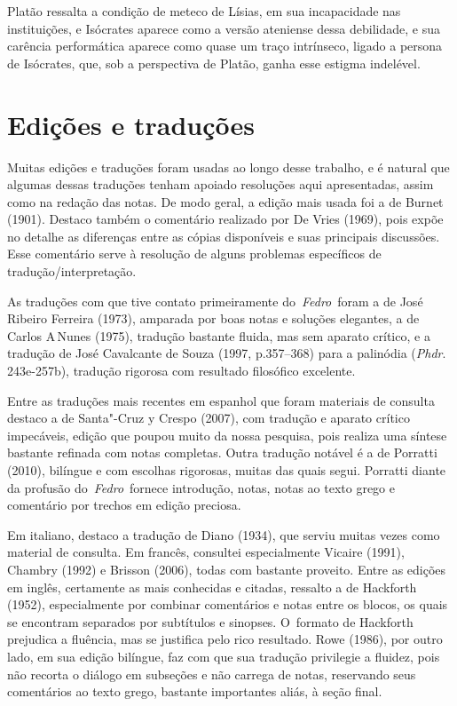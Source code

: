 Platão ressalta a condição de meteco de Lísias, em sua incapacidade nas
instituições, e Isócrates aparece como a versão ateniense dessa
debilidade, e sua carência performática aparece como quase um traço
intrínseco, ligado a persona de Isócrates, que, sob a perspectiva de
Platão, ganha esse estigma indelével.

 

\section{Edições e traduções}

 

Muitas edições e traduções foram usadas ao longo desse trabalho, e é
natural que algumas dessas traduções tenham apoiado resoluções aqui
apresentadas, assim como na redação das notas. De modo geral, a edição
mais usada foi a de Burnet (1901). Destaco também o comentário realizado
por De Vries (1969), pois expõe no detalhe as diferenças entre as cópias
disponíveis e suas principais discussões. Esse comentário serve à
resolução de alguns problemas específicos de tradução/\allowbreak{}interpretação.

As traduções com que tive contato primeiramente do~\emph{Fedro}~foram a de
José Ribeiro Ferreira (1973), amparada por boas notas e soluções
elegantes, a de Carlos A\,Nunes (1975), tradução bastante fluida, mas
sem aparato crítico, e a tradução de José Cavalcante de Souza (1997,
p.357--368) para a palinódia (\emph{Phdr}. 243e-257b), tradução rigorosa
com resultado filosófico excelente.

Entre as traduções mais recentes em espanhol que foram materiais de
consulta destaco a de Santa"-Cruz y Crespo (2007), com tradução e aparato
crítico impecáveis, edição que poupou muito da nossa pesquisa, pois
realiza uma síntese bastante refinada com notas completas. Outra
tradução notável é a de Porratti (2010), bilíngue e com escolhas
rigorosas, muitas das quais segui. Porratti diante da profusão
do~\emph{Fedro}~fornece introdução, notas, notas ao texto grego e
comentário por trechos em edição preciosa.

Em italiano, destaco a tradução de Diano (1934), que serviu muitas vezes
como material de consulta. Em francês, consultei especialmente Vicaire
(1991), Chambry (1992) e Brisson (2006), todas com bastante proveito.
Entre as edições em inglês, certamente as mais conhecidas e citadas,
ressalto a de Hackforth (1952), especialmente por combinar comentários e
notas entre os blocos, os quais se encontram separados por subtítulos e
sinopses. O~formato de Hackforth prejudica a fluência, mas se justifica
pelo rico resultado. Rowe (1986), por outro lado, em sua edição bilíngue,
faz com que sua tradução privilegie a fluidez, pois não recorta o
diálogo em subseções e não carrega de notas, reservando seus comentários
ao texto grego, bastante importantes aliás, à seção final.

